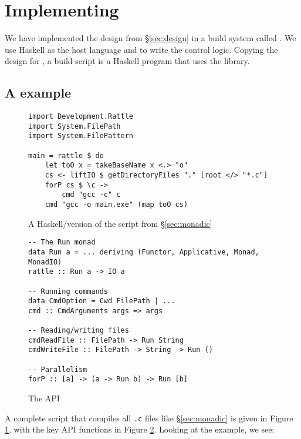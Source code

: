 \section{Implementing \Rattle}
\label{sec:implementation}

We have implemented the design from \S\ref{sec:design} in a build system called \Rattle. We use Haskell as the host language and to write the control logic. Copying the design for \Shake \cite{shake}, a \Rattle build script is a Haskell program that uses the \Rattle library.

\subsection{A \Rattle example}

\begin{figure}
\begin{verbatim}
import Development.Rattle
import System.FilePath
import System.FilePattern

main = rattle $ do
    let toO x = takeBaseName x <.> "o"
    cs <- liftIO $ getDirectoryFiles "." [root </> "*.c"]
    forP cs $ \c ->
        cmd "gcc -c" c
    cmd "gcc -o main.exe" (map toO cs)
\end{verbatim}
\caption{A Haskell/\Rattle version of the script from \S\ref{sec:monadic}}
\label{fig:rattle_example}
\end{figure}

\begin{figure}
\begin{verbatim}
-- The Run monad
data Run a = ... deriving (Functor, Applicative, Monad, MonadIO)
rattle :: Run a -> IO a

-- Running commands
data CmdOption = Cwd FilePath | ...
cmd :: CmdArguments args => args

-- Reading/writing files
cmdReadFile :: FilePath -> Run String
cmdWriteFile :: FilePath -> String -> Run ()

-- Parallelism
forP :: [a] -> (a -> Run b) -> Run [b]
\end{verbatim}
\caption{The \Rattle API}
\label{fig:api}
\end{figure}

A complete \Rattle script that compiles all \texttt{.c} files like \S\ref{sec:monadic} is given in Figure \ref{fig:rattle_example}, with the key API functions in Figure \ref{fig:api}. Looking at the example, we see:

